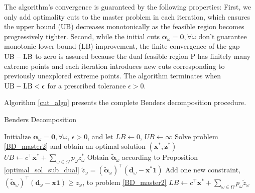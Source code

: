 The algorithm's convergence is guaranteed by the following properties: First, we only add optimality cuts to the master problem in each iteration, which ensures the upper bound (UB) decreases monotonically as the feasible region becomes progressively tighter. Second, while the initial cuts $\bm{\alpha}_{\omega} = \mathbf{0}, \forall \omega$ don't guarantee monotonic lower bound (LB) improvement, the finite convergence of the gap $\textup{UB} - \textup{LB}$ to zero is assured because the dual feasible region P has finitely many extreme points and each iteration introduces new cuts corresponding to previously unexplored extreme points. The algorithm terminates when $\textup{UB} - \textup{LB} < \epsilon$ for a prescribed tolerance $\epsilon >0$.







Algorithm \ref{cut_algo} presents the complete Benders decomposition procedure.

\begin{algorithm}[ht]
  \caption{Benders Decomposition}\label{cut_algo}
  Initialize $\bm{\alpha}_{\omega} = \mathbf{0}, \forall \omega$, $\epsilon >0$, and let $LB \gets 0$, $UB \gets \infty$\;
    {Solve problem \eqref{BD_master2} and obtain an optimal solution $(\mathbf{x}^{*}, \mathbf{z}^{*})$\;
    $UB \gets c^{\intercal} \mathbf{x}^{*} + \sum_{\omega \in \Omega} p_{\omega} z_{\omega}^{*}$\;
    {Obtain $\bm{\tilde{\alpha}}_{\omega}$ according to Proposition \ref{optimal_sol_sub_dual}\; $\tilde{z}_{\omega}= (\bm{\tilde{\alpha}}_{\omega})^{\intercal}(\mathbf{d}_{\omega}- \mathbf{x}^{*} \mathbf{1})$\;
    {Add one new constraint, $(\bm{\tilde{\alpha}}_{\omega})^{\intercal}(\mathbf{d}_{\omega}- \mathbf{x} \mathbf{1}) \geq z_{\omega}$, to problem \eqref{BD_master2}\;}
    }
    {$LB \gets c^{\intercal} \mathbf{x}^{*} + \sum_{\omega \in \Omega} p_{\omega} \tilde{z}_{\omega} $\;}
    }
\end{algorithm}

